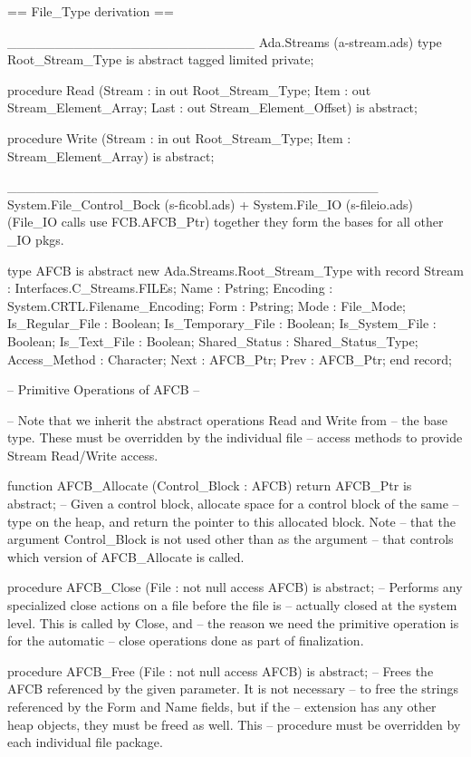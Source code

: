 
== File_Type derivation ==


__________________________
Ada.Streams (a-stream.ads)
   type Root_Stream_Type is abstract tagged limited private;

   procedure Read
     (Stream : in out Root_Stream_Type;
      Item   : out Stream_Element_Array;
      Last   : out Stream_Element_Offset)
   is abstract;

   procedure Write
     (Stream : in out Root_Stream_Type;
      Item   : Stream_Element_Array)
   is abstract;


_______________________________________
System.File_Control_Bock (s-ficobl.ads) + System.File_IO (s-fileio.ads) 
(File_IO calls use FCB.AFCB_Ptr) together they form the bases for all other _IO pkgs.

   type AFCB is abstract new Ada.Streams.Root_Stream_Type with record
      Stream   : Interfaces.C_Streams.FILEs;
      Name     : Pstring;
      Encoding : System.CRTL.Filename_Encoding;
      Form     : Pstring;
      Mode     : File_Mode;
      Is_Regular_File   : Boolean;
      Is_Temporary_File : Boolean;
      Is_System_File    : Boolean;
      Is_Text_File      : Boolean;
      Shared_Status : Shared_Status_Type;
      Access_Method : Character;
      Next : AFCB_Ptr;
      Prev : AFCB_Ptr;
   end record;

   -- Primitive Operations of AFCB --

   --  Note that we inherit the abstract operations Read and Write from
   --  the base type. These must be overridden by the individual file
   --  access methods to provide Stream Read/Write access.

   function AFCB_Allocate (Control_Block : AFCB) return AFCB_Ptr is abstract;
   --  Given a control block, allocate space for a control block of the same
   --  type on the heap, and return the pointer to this allocated block. Note
   --  that the argument Control_Block is not used other than as the argument
   --  that controls which version of AFCB_Allocate is called.

   procedure AFCB_Close (File : not null access AFCB) is abstract;
   --  Performs any specialized close actions on a file before the file is
   --  actually closed at the system level. This is called by Close, and
   --  the reason we need the primitive operation is for the automatic
   --  close operations done as part of finalization.

   procedure AFCB_Free (File : not null access AFCB) is abstract;
   --  Frees the AFCB referenced by the given parameter. It is not necessary
   --  to free the strings referenced by the Form and Name fields, but if the
   --  extension has any other heap objects, they must be freed as well. This
   --  procedure must be overridden by each individual file package.


